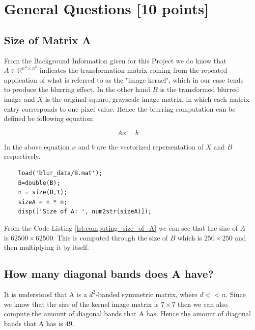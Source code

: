 \documentclass[unicode,11pt,a4paper,oneside,numbers=endperiod,openany]{scrartcl}
\begin{document}
\setassignment
{}

\newline

\assignmentpolicy


\newpage

\section{General Questions [10 points]}

\subsection{Size of Matrix A}
From the Background Information given for this Project we do know that $A \in \mathbb{R}^{n^2 \times n^2} $ indicates the transformation matrix coming from the repeated application of what is referred to as the "image kernel", which in our case tends to produce the blurring effect. In the other hand $B$ is the transformed blurred image and $X$ is the original square, grayscale image matrix, in which each matrix entry corresponds to one pixel value. Hence the blurring computation can be defined be following equation:

\begin{equation}
    Ax = b
\end{equation}

In the above equation $x$ and $b$ are the vectorized repersentation of $X$ and $B$ respectively.

\begin{lstlisting}[style=matlab, caption={Computing the size of A}, label={lst:computing_size_of_A}]
    %% Load Default Img Data
    load('blur_data/B.mat');
    B=double(B);
    n = size(B,1);
    sizeA = n * n;
    disp(['Size of A: ', num2str(sizeA)]);
\end{lstlisting}

From the Code Listing \ref{lst:computing_size_of_A} we can see that the size of $A$ is $62500 \times 62500$. This is computed through the size of $B$ which is $250 \times 250$ and then multiplying it by itself.

\subsection{How many diagonal bands does A have?}
It is understood that A is a $d^2$-banded symmetric matrix, where $d << n$. Since we know that the size of the kernel image matrix is $7 \times 7$ then we can also compute the amount of diagonal bands that A has. Hence the amount of diagonal bands that A has is $49$.
\end{document}
